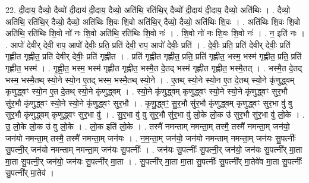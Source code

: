 \documentclass[17pt]{extarticle}
\begin{document}
22. दी॒दाय॒ दैव्यो॒ दैव्यो॑ दी॒दाय॑ दी॒दाय॒ दैव्यो॒ अति॑थि॒ रति॑थि॒र् दैव्यो॑ दी॒दाय॑ दी॒दाय॒ दैव्यो॒ अति॑थिः । . दैव्यो॒ अति॑थि॒ रति॑थि॒र् दैव्यो॒ दैव्यो॒ अति॑थिः शि॒वः शि॒वो अति॑थि॒र् दैव्यो॒ दैव्यो॒ अति॑थिः शि॒वः । . अति॑थिः शि॒वः शि॒वो अति॑थि॒ रति॑थिः शि॒वो नो॑ नः शि॒वो अति॑थि॒ रति॑थिः शि॒वो नः॑ । . शि॒वो नो॑ नः शि॒वः शि॒वो नः॑ । . न॒ इति॑ नः । . आपो॑ देवीर् देवी॒ राप॒ आपो॑ देवीः॒ प्रति॒ प्रति॑ देवी॒ राप॒ आपो॑ देवीः॒ प्रति॑ । . दे॒वीः॒ प्रति॒ प्रति॑ देवीर् देवीः॒ प्रति॑ गृह्णीत गृह्णीत॒ प्रति॑ देवीर् देवीः॒ प्रति॑ गृह्णीत । . प्रति॑ गृह्णीत गृह्णीत॒ प्रति॒ प्रति॑ गृह्णीत॒ भस्म॒ भस्म॑ गृह्णीत॒ प्रति॒ प्रति॑ गृह्णीत॒ भस्म॑ । . गृ॒ह्णी॒त॒ भस्म॒ भस्म॑ गृह्णीत गृह्णीत॒ भस्मै॒त दे॒तद् भस्म॑ गृह्णीत गृह्णीत॒ भस्मै॒तत् । . भस्मै॒त दे॒तद् भस्म॒ भस्मै॒तथ् स्यो॒ने स्यो॒न ए॒तद् भस्म॒ भस्मै॒तथ् स्यो॒ने । . ए॒तथ् स्यो॒ने स्यो॒न ए॒त दे॒तथ् स्यो॒ने कृ॑णुद्ध्वम् कृणुद्ध्वꣳ स्यो॒न ए॒त दे॒तथ् स्यो॒ने कृ॑णुद्ध्वम् । . स्यो॒ने कृ॑णुद्ध्वम् कृणुद्ध्वꣳ स्यो॒ने स्यो॒ने कृ॑णुद्ध्वꣳ सुर॒भौ सु॑र॒भौ कृ॑णुद्ध्वꣳ स्यो॒ने स्यो॒ने कृ॑णुद्ध्वꣳ सुर॒भौ । . कृ॒णु॒द्ध्वꣳ॒॒ सु॒र॒भौ सु॑र॒भौ कृ॑णुद्ध्वम् कृणुद्ध्वꣳ सुर॒भा वु॑ वु सुर॒भौ कृ॑णुद्ध्वम् कृणुद्ध्वꣳ सुर॒भा वु॑ । . सु॒र॒भा वु॑ वु सुर॒भौ सु॑र॒भा वु॑ लो॒के लो॒क उ॑ सुर॒भौ सु॑र॒भा वु॑ लो॒के । . उ॒ लो॒के लो॒क उ॑ वु लो॒के । . लो॒क इति॑ लो॒के । . तस्मै॑ नमन्ताम् नमन्ता॒म् तस्मै॒ तस्मै॑ नमन्ता॒म् जन॑यो॒ जन॑यो नमन्ता॒म् तस्मै॒ तस्मै॑ नमन्ता॒म् जन॑यः । . न॒म॒न्ता॒म् जन॑यो॒ जन॑यो नमन्ताम् नमन्ता॒म् जन॑यः सु॒पत्नीः᳚ सु॒पत्नी॒र् जन॑यो नमन्ताम् नमन्ता॒म् जन॑यः सु॒पत्नीः᳚ । . जन॑यः सु॒पत्नीः᳚ सु॒पत्नी॒र् जन॑यो॒ जन॑यः सु॒पत्नी᳚र् मा॒ता मा॒ता सु॒पत्नी॒र् जन॑यो॒ जन॑यः सु॒पत्नी᳚र् मा॒ता । . सु॒पत्नी᳚र् मा॒ता मा॒ता सु॒पत्नीः᳚ सु॒पत्नी᳚र् मा॒तेवे॑व मा॒ता सु॒पत्नीः᳚ सु॒पत्नी᳚र् मा॒तेव॑ । \newline
\end{document}
